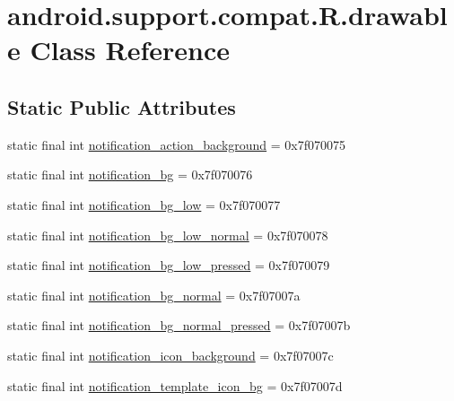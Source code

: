 \hypertarget{classandroid_1_1support_1_1compat_1_1_r_1_1drawable}{}\section{android.\+support.\+compat.\+R.\+drawable Class Reference}
\label{classandroid_1_1support_1_1compat_1_1_r_1_1drawable}
\subsection*{Static Public Attributes}
\begin{DoxyCompactItemize}
\item 
static final int \mbox{\hyperlink{classandroid_1_1support_1_1compat_1_1_r_1_1drawable_a5a0ff2bac77963f6f055c8a58fa8cddc}{notification\+\_\+action\+\_\+background}} = 0x7f070075
\item 
static final int \mbox{\hyperlink{classandroid_1_1support_1_1compat_1_1_r_1_1drawable_ac1c881403cf01387a0e98a7570b876b5}{notification\+\_\+bg}} = 0x7f070076
\item 
static final int \mbox{\hyperlink{classandroid_1_1support_1_1compat_1_1_r_1_1drawable_a50d65295159113b04a778cb5ba4e2867}{notification\+\_\+bg\+\_\+low}} = 0x7f070077
\item 
static final int \mbox{\hyperlink{classandroid_1_1support_1_1compat_1_1_r_1_1drawable_a36abe44ab726cfdcec08ea89273622cd}{notification\+\_\+bg\+\_\+low\+\_\+normal}} = 0x7f070078
\item 
static final int \mbox{\hyperlink{classandroid_1_1support_1_1compat_1_1_r_1_1drawable_a7a21ec6e1a66256a6e5fb1c7086d77f0}{notification\+\_\+bg\+\_\+low\+\_\+pressed}} = 0x7f070079
\item 
static final int \mbox{\hyperlink{classandroid_1_1support_1_1compat_1_1_r_1_1drawable_acc54d2d50a9408e4498025dfd0f797a2}{notification\+\_\+bg\+\_\+normal}} = 0x7f07007a
\item 
static final int \mbox{\hyperlink{classandroid_1_1support_1_1compat_1_1_r_1_1drawable_adb300808ead93d2b6dfaaddcc86b1c10}{notification\+\_\+bg\+\_\+normal\+\_\+pressed}} = 0x7f07007b
\item 
static final int \mbox{\hyperlink{classandroid_1_1support_1_1compat_1_1_r_1_1drawable_a24197e0b532bda0461aa61918e2e1aee}{notification\+\_\+icon\+\_\+background}} = 0x7f07007c
\item 
static final int \mbox{\hyperlink{classandroid_1_1support_1_1compat_1_1_r_1_1drawable_a031cc831b36dacf4d9503beaf4ee1190}{notification\+\_\+template\+\_\+icon\+\_\+bg}} = 0x7f07007d

\end{DoxyCompactItemize}
